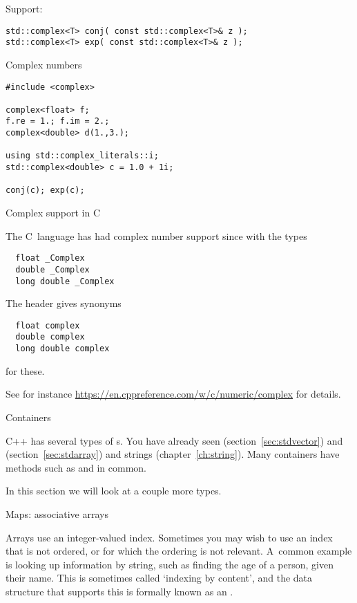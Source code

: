 Support:
\begin{lstlisting}
std::complex<T> conj( const std::complex<T>& z );
std::complex<T> exp( const std::complex<T>& z );
\end{lstlisting}

\begin{slide}{Complex numbers}
  \label{sl-complex}
\begin{lstlisting}
#include <complex>

complex<float> f;
f.re = 1.; f.im = 2.;
complex<double> d(1.,3.);

using std::complex_literals::i;
std::complex<double> c = 1.0 + 1i;

conj(c); exp(c);
\end{lstlisting}
\end{slide}

 {Complex support in C}

The C~language has had complex number support
since  with the types
\begin{lstlisting}
  float _Complex
  double _Complex
  long double _Complex
\end{lstlisting}
The header 
gives synonyms
\begin{lstlisting}
  float complex
  double complex
  long double complex
\end{lstlisting}
for these.

See for instance \url{https://en.cppreference.com/w/c/numeric/complex}
for details.

 {Containers}

C++ has several types of s.
You have already seen 
(section~\ref{sec:stdvector})
and 
(section~\ref{sec:stdarray})
and strings (chapter~\ref{ch:string}).
Many containers have 
methods such as  and  in common.

In this section we will look at a couple more types.

 {Maps: associative arrays}
\label{sec:map}

Arrays use an integer-valued index. Sometimes you may wish to use an
index that is not ordered, or for which the ordering is not relevant.
A~common example is looking up information by string, such as finding
the age of a person, given their name. This is sometimes called
`indexing by content', and the data structure that supports this is
formally known as an .


